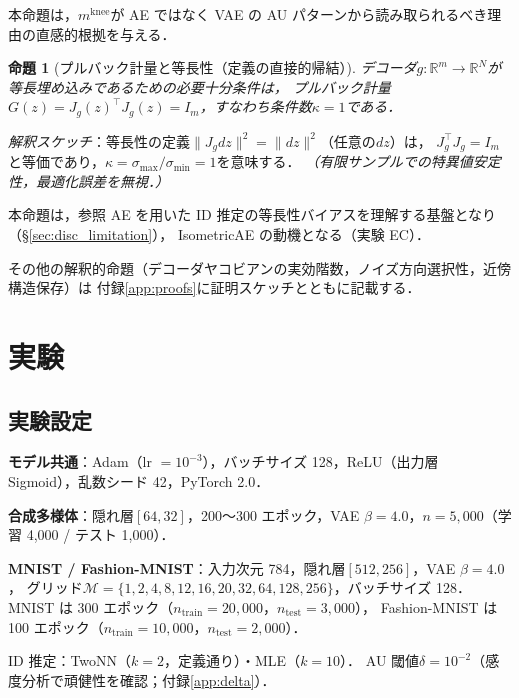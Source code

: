 \documentclass[11pt,a4paper]{jsarticle}
\newtheorem{proposition}{命題}
\newcommand{\Jg}{J_g}
\newcommand{\R}{\mathbb{R}}
\newcommand{\kap}{\kappa}
\newcommand{\mknee}{m^{\mathrm{knee}}}
\begin{document}
本命題は，$\mknee$が AE ではなく VAE の AU パターンから読み取られるべき理由の直感的根拠を与える．

\begin{proposition}[プルバック計量と等長性（定義の直接的帰結）]\label{thm:pullback}
デコーダ$g: \R^m \to \R^N$が等長埋め込みであるための必要十分条件は，
プルバック計量$G(z) = \Jg(z)^\top \Jg(z) = I_m$，すなわち条件数$\kap = 1$である．
\end{proposition}

\textit{解釈スケッチ}：等長性の定義$\|J_g dz\|^2 = \|dz\|^2$（任意の$dz$）は，
$J_g^\top J_g = I_m$と等価であり，$\kap = \sigma_{\max}/\sigma_{\min} = 1$を意味する．
\textit{（有限サンプルでの特異値安定性，最適化誤差を無視．）}

本命題は，参照 AE を用いた ID 推定の等長性バイアスを理解する基盤となり（§\ref{sec:disc_limitation}），
IsometricAE の動機となる（実験 EC）．

その他の解釈的命題（デコーダヤコビアンの実効階数，ノイズ方向選択性，近傍構造保存）は
付録\ref{app:proofs}に証明スケッチとともに記載する．

\section{実験}\label{sec:exp}

\subsection{実験設定}\label{sec:exp_setup}

\textbf{モデル共通}：Adam（lr $= 10^{-3}$），バッチサイズ 128，ReLU（出力層 Sigmoid），乱数シード 42，PyTorch 2.0．

\textbf{合成多様体}：隠れ層$[64, 32]$，200〜300 エポック，VAE $\beta = 4.0$，$n = 5{,}000$（学習 4,000 / テスト 1,000）．

\textbf{MNIST / Fashion-MNIST}：入力次元 784，隠れ層$[512, 256]$，VAE $\beta = 4.0$，
グリッド$\mathcal{M} = \{1,2,4,8,12,16,20,32,64,128,256\}$，バッチサイズ 128．
MNIST は 300 エポック（$n_{\mathrm{train}} = 20{,}000$，$n_{\mathrm{test}} = 3{,}000$），
Fashion-MNIST は 100 エポック（$n_{\mathrm{train}} = 10{,}000$，$n_{\mathrm{test}} = 2{,}000$）．

ID 推定：TwoNN（$k=2$，定義通り）・MLE（$k=10$）\cite{facco2017twonn,levina2005mle}．
AU 閾値$\delta = 10^{-2}$\cite{lucas2019elbo}（感度分析で頑健性を確認；付録\ref{app:delta}）．
\end{document}
